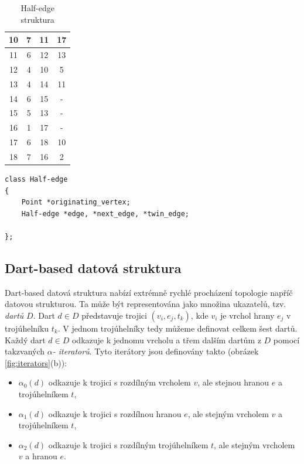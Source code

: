 \documentclass[12pt,a4paper]{article}
\begin{document}
{\begin{table}[h!]
\begin{tabular}{|c||c||c|c|}
10                         & 7                                 & 11                         & 17        \\ \hline
11                         & 6                                 & 12                         & 13        \\ \hline
12                         & 4                                 & 10                         & 5         \\ \hline
13                         & 4                                 & 14                         & 11        \\ \hline
14                         & 6                                 & 15                         & -         \\ \hline
15                         & 5                                 & 13                         & -         \\ \hline
16                         & 1                                 & 17                         & -         \\ \hline
17                         & 6                                 & 18                         & 10        \\ \hline
18                         & 7                                 & 16                         & 2         \\ \hline
\end{tabular}
\caption{Half-edge struktura}
\label{tab:half_edge}
\end{table}

\newpage
\begin{lstlisting}[caption={Definice datové struktury}]
class Half-edge
{
	Point *originating_vertex;
	Half-edge *edge, *next_edge, *twin_edge;
	
};
\end{lstlisting}

\subsection{Dart-based datová struktura}

Dart-based datová struktura nabízí extrémně rychlé procházení
topologie napříč datovou strukturou. Ta může být representována jako
množina ukazatelů, tzv. \emph{dartů} $D$. Dart $d \in D$ představuje
trojici $(v_i, e_j, t_k)$, kde $v_i$ je vrchol hrany $e_j$ v
trojúhelníku $t_k$. V jednom trojúhelníky tedy můžeme definovat celkem
šest dartů. Každý dart $d \in D$ odkazuje k jednomu vrcholu a třem
dalším dartům z $D$ pomocí takzvaných $\alpha$\emph{- iteratorů}. Tyto
iterátory jsou definovány takto (obrázek \ref{fig:iterators}(b)):
\begin{itemize}
\item $\alpha_0(d)$ odkazuje k trojici s rozdílným vrcholem $v$, ale stejnou hranou $e$ a trojúhelníkem $t$,
\item $\alpha_1(d)$ odkazuje k trojici s rozdílnou hranou $e$, ale stejným vrcholem $v$ a trojúhelníkem $t$,
\item $\alpha_2(d)$ odkazuje k trojici s rozdílným trojúhelníkem $t$, ale stejným vrcholem $v$ a hranou $e$.
\end{itemize}

}
\end{document}
